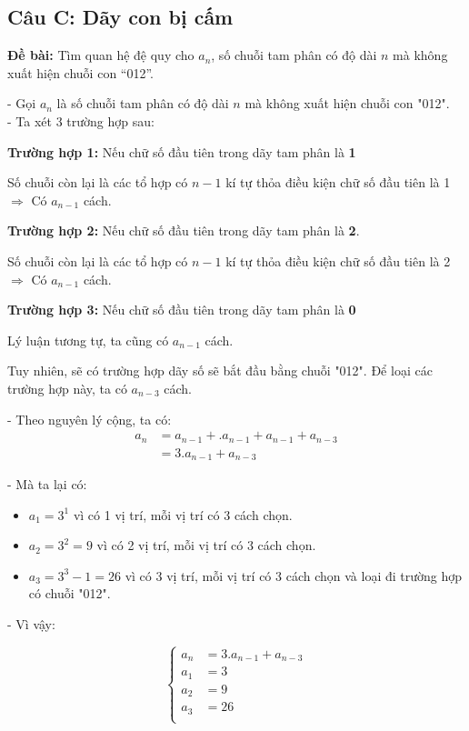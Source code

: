 \documentclass[12pt]{article}
\newcommand{\SubItem}[1]{
    {\setlength\itemindent{15pt} \item[-] #1}
}
\begin{document}
\begin{sloppypar}
\subsection{Câu C: Dãy con bị cấm}
\begin{tcolorbox}
    \textbf{Đề bài:} Tìm quan hệ đệ quy cho \(a_{n}\), số chuỗi tam phân có độ dài \(n\) mà không xuất hiện chuỗi con “012”.
\end{tcolorbox}

- Gọi \(a_{n}\) là số chuỗi tam phân có độ dài \(n\) mà không xuất hiện chuỗi con "012". \\
- Ta xét 3 trường hợp sau:
\begin{itemize}
    \item \textbf{Trường hợp 1:} Nếu chữ số đầu tiên trong dãy tam phân là \textbf{1} 
        \SubItem{Số chuỗi còn lại là các tổ hợp có \(n-1\) kí tự thỏa điều kiện chữ số đầu tiên là 1 \(\Rightarrow\) Có \(a_{n-1}\) cách.}
    \item \textbf{Trường hợp 2:} Nếu chữ số đầu tiên trong dãy tam phân là \textbf{2}.
        \SubItem{Số chuỗi còn lại là các tổ hợp có \(n-1\) kí tự thỏa điều kiện chữ số đầu tiên là 2 \(\Rightarrow\) Có \(a_{n-1}\) cách.}
    \item \textbf{Trường hợp 3:} Nếu chữ số đầu tiên trong dãy tam phân là \textbf{0}
        \SubItem{Lý luận tương tự, ta cũng có \(a_{n-1}\) cách.} 
        \SubItem{Tuy nhiên, sẽ có trường hợp dãy số sẽ bắt đầu bằng chuỗi "012". Để loại các trường hợp này, ta có \(a_{n-3}\) cách. }
\end{itemize}

- Theo nguyên lý cộng, ta có:
\begin{align*}
    a_{n}   & = a_{n-1} + .a_{n-1} + a_{n-1} + a_{n-3} \\
            & = 3.a_{n-1} + a_{n-3}
\end{align*}

- Mà ta lại có:

\begin{itemize}
    \item \(a_{1} = 3^{1}\) vì có 1 vị trí, mỗi vị trí có 3 cách chọn.
    \item \(a_{2} = 3^{2} = 9\) vì có 2 vị trí, mỗi vị trí có 3 cách chọn.
    \item \(a_{3} = 3^{3} - 1 = 26\) vì có 3 vị trí, mỗi vị trí có 3 cách chọn và loại đi trường hợp có chuỗi "012".
\end{itemize}

- Vì vậy:

\[
    \begin{cases}
        a_{n} & = 3.a_{n-1} + a_{n-3}\\             
        a_{1} & = 3 \\
        a_{2} & = 9 \\
        a_{3} & = 26 \\
    \end{cases} 
    \]



\end{sloppypar}
\end{document}
